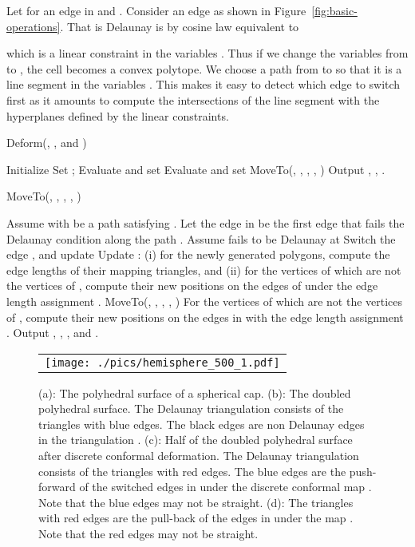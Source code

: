 \documentclass[11pt]{article}
\begin{document}
Let  for an 
edge  in  and . Consider an edge 
as shown in Figure~\ref{fig:basic-operations}.  That  is Delaunay is by cosine law
equivalent to 

which is a linear constraint in the variables . Thus if we change the variables from  to , the 
cell  becomes a convex polytope. We choose a path from  to 
so that it is a line segment in the variables . This makes it easy to detect which edge to switch first
as it amounts to compute the intersections of the line segment with the hyperplanes defined by the 
linear constraints.  

\begin{algorithm}[!h]
\caption{Deform(, ,  and )}
\label{alg:deform}
\begin{algorithmic}[1]
\STATE Initialize 
\STATE Set ;
\STATE Evaluate  and set 
\WHILE {} 
\STATE Evaluate  and set  
\STATE MoveTo(, , , , )
\STATE 
\ENDWHILE
\STATE Output , , .
\end{algorithmic}
\end{algorithm}

\begin{algorithm*}[!h]
\caption{MoveTo(, , , , )}
\label{alg:moveto}
\begin{algorithmic}[1]
\STATE Assume  with  be a path satisfying . 
\STATE Let the edge  in  be the first edge that fails the Delaunay condition along the path . 
\STATE Assume  fails to be Delaunay at 
\STATE Switch the edge , and update 
\STATE Update : (i) for the newly generated polygons, compute the edge lengths of their mapping triangles, 
and (ii) for the vertices of  which are not the vertices of , 
compute their new positions on the edges of  under the edge length assignment . 
\STATE MoveTo(, , , , )
\ELSE
\STATE For the vertices of  which are not the vertices of , compute their new positions 
on the edges in  with the edge length assignment .
\ENDIF
\STATE Output , , , and .
\end{algorithmic}
\end{algorithm*}


\begin{figure}[!t]
\begin{center}
\begin{tabular}{c}
\texttt{[image: ./pics/hemisphere\_500\_1.pdf]}
\end{tabular}
\end{center}
\vspace{0.1in}
\caption{(a): The polyhedral surface  of a spherical cap.  
(b): The doubled polyhedral surface. The Delaunay 
triangulation  consists of the triangles with blue edges. 
The black edges are non Delaunay edges in the triangulation . 
(c): Half of the doubled polyhedral surface after discrete conformal deformation. 
The Delaunay triangulation  consists of the triangles with red edges. 
The blue edges are the push-forward of the switched edges in 
under the discrete conformal map . 
Note that the blue edges may not be straight. 
(d): The triangles with red edges are the pull-back of the edges in  
under the map . Note that the red edges may not be straight. 
\label{fig:algorithm_illustration}}
\end{figure}
\end{document}
